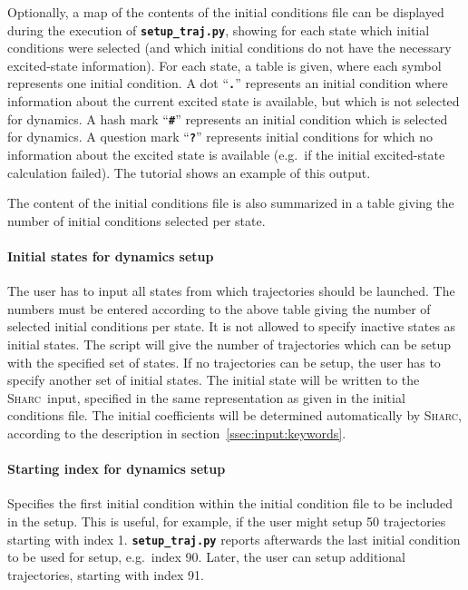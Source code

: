 \documentclass[a4paper,10pt,DIV=15,openany]{scrbook}
\newcommand{\sharc}{\textsc{Sharc}}
\newcommand{\ttt}[1]{\textbf{\texttt{#1}}}
\begin{document}
Optionally, a map of the contents of the initial conditions file can be displayed during the execution of \ttt{setup\_traj.py}, showing for each state which initial conditions were selected (and which initial conditions do not have the necessary excited-state information). For each state, a table is given, where each symbol represents one initial condition. A dot ``\ttt{.}'' represents an initial condition where information about the current excited state is available, but which is not selected for dynamics. A hash mark ``\ttt{\#}'' represents an initial condition which is selected for dynamics. A question mark ``\ttt{?}'' represents initial conditions for which no information about the excited state is available (e.g.\ if the initial excited-state calculation failed). The tutorial shows an example of this output.

The content of the initial conditions file is also summarized in a table giving the number of initial conditions selected per state. 

\paragraph{Initial states for dynamics setup}

The user has to input all states from which trajectories should be launched. The numbers must be entered according to the above table giving the number of selected initial conditions per state. It is not allowed to specify inactive states as initial states. The script will give the number of trajectories which can be setup with the specified set of states. If no trajectories can be setup, the user has to specify another set of initial states. The initial state will be written to the \sharc\ input, specified in the same representation as given in the initial conditions file. The initial coefficients will be determined automatically by \sharc, according to the description in section~\ref{ssec:input:keywords}.

\paragraph{Starting index for dynamics setup}

Specifies the first initial condition within the initial condition file to be included in the setup. This is useful, for example, if the user might setup 50 trajectories starting with index 1. \ttt{setup\_traj.py} reports afterwards the last initial condition to be used for setup, e.g.\ index 90. Later, the user can setup additional trajectories, starting with index 91.
\end{document}
